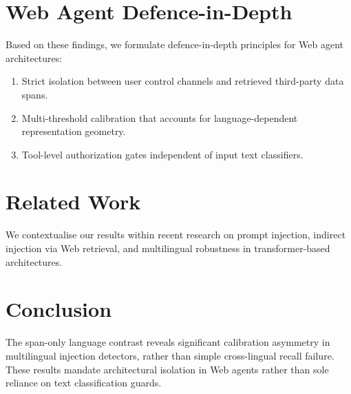 \documentclass[sigconf,anonymous,review]{acmart}
\begin{document}
\section{Web Agent Defence-in-Depth}
Based on these findings, we formulate defence-in-depth principles for Web agent architectures:
\begin{enumerate}
    \item Strict isolation between user control channels and retrieved third-party data spans.
    \item Multi-threshold calibration that accounts for language-dependent representation geometry.
    \item Tool-level authorization gates independent of input text classifiers.
\end{enumerate}

\section{Related Work}
We contextualise our results within recent research on prompt injection, indirect injection via Web retrieval, and multilingual robustness in transformer-based architectures.

\section{Conclusion}
The span-only language contrast reveals significant calibration asymmetry in multilingual injection detectors, rather than simple cross-lingual recall failure. These results mandate architectural isolation in Web agents rather than sole reliance on text classification guards.



\end{document}
